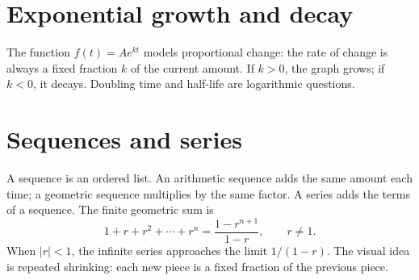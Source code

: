 \documentclass[11pt,oneside,openany]{book}
\newcommand{\abs}[1]{\left|#1\right|}
\begin{document}
\section{Exponential growth and decay}

The function $f(t)=Ae^{kt}$ models proportional change: the rate of change is always a fixed fraction $k$ of the current amount. If $k>0$, the graph grows; if $k<0$, it decays. Doubling time and half-life are logarithmic questions.

\begin{center}
\end{center}

\section{Sequences and series}

A sequence is an ordered list. An arithmetic sequence adds the same amount each time; a geometric sequence multiplies by the same factor. A series adds the terms of a sequence. The finite geometric sum is
\[
  1+r+r^2+\cdots+r^n=\frac{1-r^{n+1}}{1-r},\qquad r\ne1.
\]
When $\abs r<1$, the infinite series approaches the limit $1/(1-r)$. The visual idea is repeated shrinking: each new piece is a fixed fraction of the previous piece.

\begin{center}
\end{center}
\end{document}
